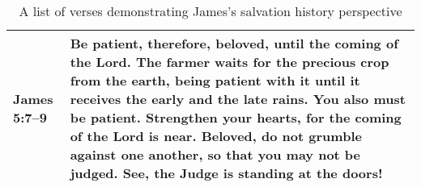 \begin{table}
    \footnotesize
    \begin{center}
        \begin{tabulary}{\linewidth}{lL}
            \toprule
James 5:7--9 & Be patient, therefore, 
beloved, until the coming of the Lord. The farmer waits for the precious crop 
from the earth, being patient with it until it receives the early and the late 
rains. You also must be patient. Strengthen your hearts, for the coming of the 
Lord is near. Beloved, do not grumble against one another, so that you may not 
be judged. See, the Judge is standing at the doors! \\
            \bottomrule
        \end{tabulary}
    \end{center}
    \caption{A list of verses demonstrating James's salvation history perspective}
\label{tab:shp-james}
\end{table}

